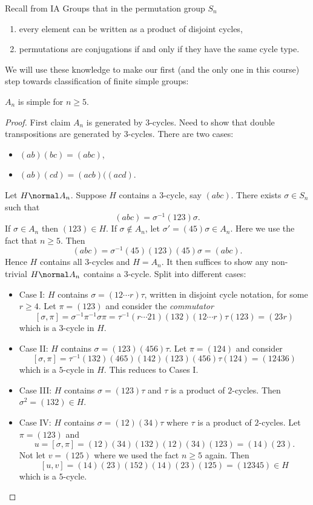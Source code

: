 \documentclass[a4paper]{article}
\begin{document}
Recall from IA Groups that in the permutation group \(S_n\)
\begin{enumerate}
\item every element can be written as a product of disjoint cycles,
\item permutations are conjugations if and only if they have the same cycle type.
\end{enumerate}

We will use these knowledge to make our first (and the only one in this course) step towards classification of finite simple groups:

\begin{theorem}
  \(A_n\) is simple for \(n \geq 5\).
\end{theorem}

\begin{proof}
  First claim \(A_n\) is generated by \(3\)-cycles. Need to show that double transpositions are generated by \(3\)-cycles. There are two cases:
  \begin{itemize}
  \item \((ab)(bc) = (abc)\),
  \item \((ab)(cd) = (acb)((acd)\).
  \end{itemize}

  Let \(H \normal A_n\). Suppose \(H\) contains a \(3\)-cycle, say \((abc)\). There exists \(\sigma \in S_n\) such that
  \[
    (abc) = \sigma^{-1}(123)\sigma.
  \]
  If \(\sigma \in A_n\) then \((123) \in H\). If \(\sigma \notin A_n\), let \(\sigma' = (45)\sigma \in A_n\). Here we use the fact that \(n \geq 5\). Then
  \[
    (abc) = \sigma^{-1}(45)(123)(45)\sigma = (abc).
  \]
  Hence \(H\) contains all \(3\)-cycles and \(H = A_n\). It then suffices to show any non-trivial \(H \normal A_n\) contains a \(3\)-cycle. Split into different cases:
  \begin{itemize}
  \item Case I: \(H\) contains \(\sigma = (12 \cdots r)\tau\), written in disjoint cycle notation, for some \( r \geq 4\). Let \(\pi = (123)\) and consider the \emph{commutator}
    \[
      [\sigma, \pi] = \sigma^{-1}\pi^{-1}\sigma\pi = \tau^{-1}(r \cdots 21)(132)(12 \cdots r)\tau(123) = (23r)
    \]
    which is a \(3\)-cycle in \(H\).
  \item Case II: \(H\) contains \(\sigma = (123)(456)\tau\). Let \(\pi = (124)\) and consider
    \[
      [\sigma, \pi] = \tau^{-1}(132)(465)(142)(123)(456)\tau(124) = (12436)
    \]
    which is a \(5\)-cycle in \(H\). This reduces to Cases I.
  \item Case III: \(H\) contains \(\sigma = (123)\tau\) and \(\tau\) is a product of \(2\)-cycles. Then \(\sigma^2 = (132) \in H\).
  \item Case IV: \(H\) contains \(\sigma = (12)(34)\tau\) where \(\tau\) is a product of \(2\)-cycles. Let \(\pi = (123)\) and
    \[
      u = [\sigma, \pi] = (12)(34)(132)(12)(34)(123) = (14)(23).
    \]
    Not let \(v = (125)\) where we used the fact \(n \geq 5\) again. Then
    \[
      [u, v] = (14)(23)(152)(14)(23)(125) = (12345) \in H
    \]
    which is a \(5\)-cycle.
  \end{itemize}
\end{proof}
\end{document}

